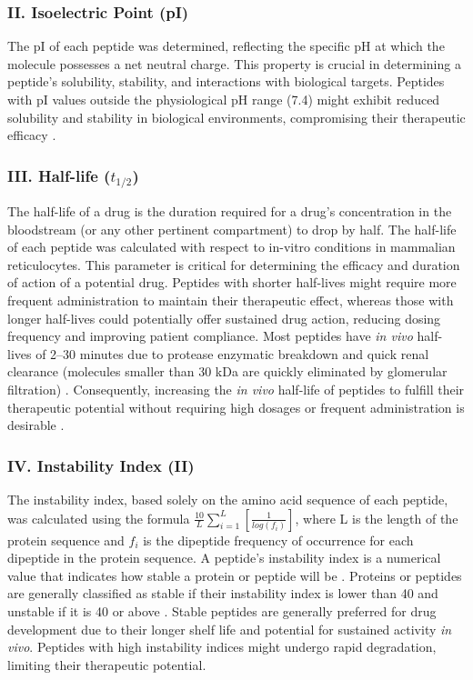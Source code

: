 \subsubsection*{II. Isoelectric Point (pI)}
The pI of each peptide was determined, reflecting the specific pH at which the molecule possesses a net neutral charge. This property is crucial in determining a peptide's solubility, stability, and interactions with biological targets. Peptides with pI values outside the physiological pH range (7.4) might exhibit reduced solubility and stability in biological environments, compromising their therapeutic efficacy \cite{frolov2022pichemist}.

\subsubsection*{III. Half-life ($t_{1/2}$)}
The half-life of a drug is the duration required for a drug's concentration in the bloodstream (or any other pertinent compartment) to drop by half. The half-life of each peptide was calculated with respect to in-vitro conditions in mammalian reticulocytes. This parameter is critical for determining the efficacy and duration of action of a potential drug. Peptides with shorter half-lives might require more frequent administration to maintain their therapeutic effect, whereas those with longer half-lives could potentially offer sustained drug action, reducing dosing frequency and improving patient compliance. Most peptides have \textit{in vivo} half-lives of 2–30 minutes due to protease enzymatic breakdown and quick renal clearance (molecules smaller than 30 kDa are quickly eliminated by glomerular filtration) \cite{penchala2015biomimetic}. Consequently, increasing the \textit{in vivo} half-life of peptides to fulfill their therapeutic potential without requiring high dosages or frequent administration is desirable \cite{penchala2015biomimetic}. 

\subsubsection*{IV. Instability Index (II)}
The instability index, based solely on the amino acid sequence of each peptide, was calculated using the formula $\frac{10}{L}\sum_{i=1}^{L} \left[\frac{1}{log(f_i)}\right] $, where L is the length of the protein sequence and $f_i$ is the dipeptide frequency of occurrence for each dipeptide in the protein sequence. A peptide's instability index is a numerical value that indicates how stable a protein or peptide will be \cite{Guruprasad1990}. Proteins or peptides are generally classified as stable if their instability index is lower than 40 and unstable if it is 40 or above \cite{Guruprasad1990}. Stable peptides are generally preferred for drug development due to their longer shelf life and potential for sustained activity \textit{in vivo}. Peptides with high instability indices might undergo rapid degradation, limiting their therapeutic potential.

